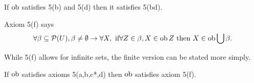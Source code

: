 \begin{theorem}\label{bd5}
	\leanok
	If $\operatorname{ob}$ satisfies 5(b) and 5(d) then it satisfies 5(bd).
\end{theorem}

\begin{definition}\label{CJ5f}
	\leanok
	Axiom 5(f) says
	\[
		\forall \beta \subseteq \mathcal P(U), \beta \ne \emptyset \rightarrow
		\forall X, \text{ if} \forall Z \in \beta, X \in \operatorname{ob} Z \text{ then } X \in \operatorname{ob} \bigcup \beta.
	\]
\end{definition}
While 5(f) allows for infinite sets, the finite version can be stated more simply.

\begin{theorem}\label{II22}
	\leanok
	If $\operatorname{ob}$ satisfies axioms 5(a,b,c*,d) then $\operatorname{ob}$ satisfies axiom 5(f).
\end{theorem}